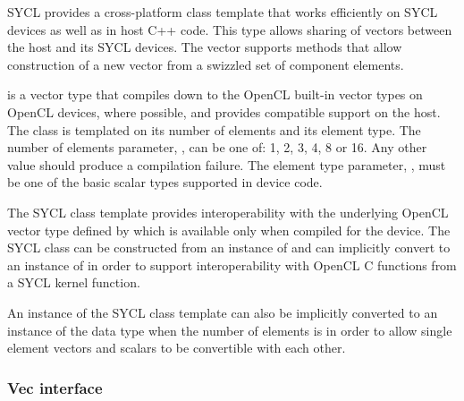 %



SYCL provides a cross-platform class template that works
efficiently on SYCL devices as well as in host C++ code. This type
allows sharing of vectors between the host and its SYCL devices. The
vector supports methods that allow construction of a new vector from a
swizzled set of component elements.

 is a vector type that
compiles down to the OpenCL built-in vector types on OpenCL devices, where
possible, and provides compatible support on the host. The 
class is templated on its number of elements and its element type. The number of
elements parameter, , can be one of: 1, 2, 3, 4, 8 or 16. Any
other value should produce a compilation failure. The element type parameter,
, must be one of the basic scalar types supported in device code.

The SYCL  class template provides interoperability with the
underlying OpenCL vector type defined by  which is
available only when compiled for the device. The SYCL  class can
be constructed from an instance of  and can implicitly
convert to an instance of  in order to support
interoperability with OpenCL C functions from a SYCL kernel function.

An instance of the SYCL  class template can also be
implicitly converted to an instance of the data type when the number of
elements is  in order to allow single element vectors and
scalars to be convertible with each other.

\subsubsection{Vec interface}

